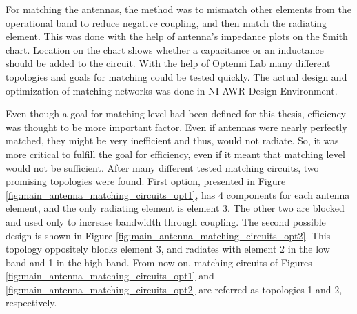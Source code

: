 For matching the antennas, the method was to mismatch other elements from the operational band to reduce negative coupling, and then match the radiating element. This was done with the help of antenna's impedance plots on the Smith chart. Location on the chart shows whether a capacitance or an inductance should be added to the circuit. With the help of Optenni Lab many different topologies and goals for matching could be tested quickly. The actual design and optimization of matching networks was done in NI AWR Design Environment.

Even though a goal for matching level had been defined for this thesis, efficiency was thought to be more important factor. Even if antennas were nearly perfectly matched, they might be very inefficient and thus, would not radiate. So, it was more critical to fulfill the goal for efficiency, even if it meant that matching level would not be sufficient. After many different tested matching circuits, two promising topologies were found. First option, presented in Figure \ref{fig:main_antenna_matching_circuits_opt1}, has 4 components for each antenna element, and the only radiating element is element 3. The other two are blocked and used only to increase bandwidth through coupling. The second possible design is shown in Figure \ref{fig:main_antenna_matching_circuits_opt2}. This topology oppositely blocks element 3, and radiates with element 2 in the low band and 1 in the high band. From now on, matching circuits of Figures \ref{fig:main_antenna_matching_circuits_opt1} and \ref{fig:main_antenna_matching_circuits_opt2} are referred as topologies 1 and 2, respectively.

